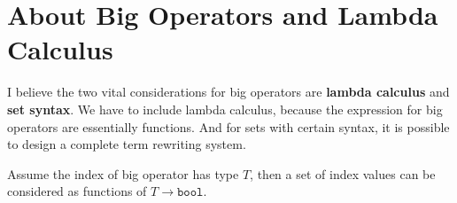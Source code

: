 






\section{About Big Operators and Lambda Calculus}
I believe the two vital considerations for big operators are \textbf{lambda calculus} and \textbf{set syntax}. We have to include lambda calculus, because the expression for big operators are essentially functions. And for sets with certain syntax, it is possible to design a complete term rewriting system.

Assume the index of big operator has type $T$, then a set of index values can be considered as functions of $T \to \texttt{bool}$.


